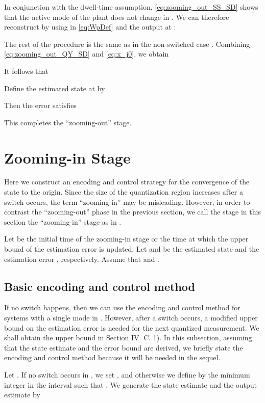 \documentclass[letterpaper, 11pt, onecolumn]{ieeeconf}  \IEEEoverridecommandlockouts
\begin{document}
In conjunction with the dwell-time assumption, 
\eqref{eq:zooming_out_SS_SD} shows that
the active mode of the plant does not change in 
.
We can therefore reconstruct  by using
 in \eqref{eq:WpDef} and the output at 
:

The rest of the procedure is the same as in the non-switched 
case \cite{Liberzon2003}.
Combining
\eqref{eq:zooming_out_QY_SD} and \eqref{eq:x_j0}, 
we obtain

It follows that

Define the estimated state  at  by

Then the error  satisfies

This completes the ``zooming-out'' stage.



\section{Zooming-in Stage}
Here we construct an encoding and control strategy for the
convergence of the state to the origin.
Since the size  of the quantization region increases
after a switch occurs, the term ``zooming-in'' may be misleading.
However, in order to contrast the ``zooming-out'' phase in the
previous section, 
we call the stage in this section the ``zooming-in'' stage as in
\cite{Liberzon2003Automatica,Brockett2000}.

Let  be the initial time of the zooming-in stage
or the time at which the upper bound  of the estimation error is updated. 
Let  and  be the estimated state and the estimation error ,
respectively.
Assume that  and 
.


\subsection{Basic encoding and control method}
If no switch happens, then
we can use the encoding and control method
for systems with a single mode in \cite{Liberzon2003}.
However, after a switch occurs, a modified upper bound on 
the estimation error is needed for the next quantized measurement.
We shall obtain the upper bound in 
Section IV. C. 1).
In this subsection, assuming that the state estimate  and
the error bound 
are derived, we
briefly state the encoding and control method 
because it will be needed in the sequel.

Let .
If no switch occurs in ,
we set , and otherwise we define 
by the minimum integer in the interval  such that 
.
We generate the state estimate  and the output estimate  by
\end{document}
